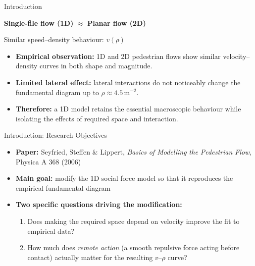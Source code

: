 \documentclass{beamer}
\begin{document}
\begin{frame}{Introduction}

\vspace{-0.55cm}

\vspace{0.20cm}

\begin{center}
    {\Large
    \textbf{Single-file flow (1D)}
    \(\approx\)
    \textbf{Planar flow (2D)}
    }

    \vspace{0.06cm}

    {\scriptsize
    Similar speed--density behaviour: $v(\rho)$
    }
\end{center}

\vspace{0.12cm}

{\footnotesize
\raggedright

\begin{itemize}
    \setlength{\itemsep}{4pt}
    \setlength{\topsep}{2pt}

    \item \textbf{Empirical observation:} 1D and 2D pedestrian flows show
    similar velocity--density curves in both shape and magnitude.

    \item \textbf{Limited lateral effect:} lateral interactions do not
    noticeably change the fundamental diagram up to
    $\rho \approx 4.5\,\mathrm{m}^{-2}$.

    \item \textbf{Therefore:} a 1D model retains the essential macroscopic
    behaviour while isolating the effects of required space and interaction.
\end{itemize}
}

\end{frame}


\begin{frame}{Introduction: Research Objectives}
    \begin{itemize}
        \item \textbf{Paper:} Seyfried, Steffen \& Lippert, \emph{Basics of Modelling the Pedestrian Flow}, Physica A 368 (2006)
        \item \textbf{Main goal:} modify the 1D social force model so that it reproduces the empirical fundamental diagram
        \item \textbf{Two specific questions driving the modification:}
        \begin{enumerate}
            \item Does making the required space depend on velocity improve the fit to empirical data?
            \item How much does \emph{remote action} (a smooth repulsive force acting before contact) actually matter for the resulting $v$--$\rho$ curve?
        \end{enumerate}
    \end{itemize}
\end{frame}
\end{document}
